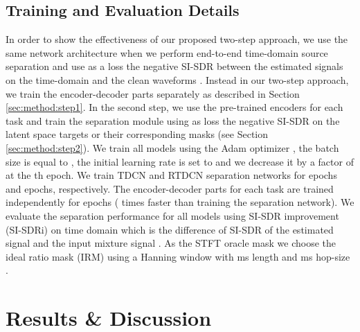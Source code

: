 \documentclass{article}
\begin{document}
\subsection{Training and Evaluation Details}
In order to show the effectiveness of our proposed two-step approach, we use the same network architecture when we perform end-to-end time-domain source separation and use as a loss the negative SI-SDR between the estimated signals on the time-domain and the clean waveforms . Instead in our two-step approach, we train the encoder-decoder parts separately as described in Section \ref{sec:method:step1}. In the second step, we use the pre-trained encoders for each task and train the separation module using as loss the negative SI-SDR on the latent space targets  or their corresponding masks  (see Section \ref{sec:method:step2}). We train all models using the Adam optimizer \cite{adam}, the batch size is equal to , the initial learning rate is set to  and we decrease it by a factor of  at the th epoch. We train TDCN and RTDCN separation networks for  epochs and  epochs, respectively. The encoder-decoder parts for each task are trained independently for  epochs ( times faster than training the separation network). We evaluate the separation performance for all models using SI-SDR improvement (SI-SDRi) on time domain which is the difference of SI-SDR of the estimated signal and the input mixture signal \cite{luo2019convTasNet, kavalerov2019universal}. As the STFT oracle mask we choose the ideal ratio mask (IRM) using a Hanning window with ms length and ms hop-size \cite{luo2019convTasNet}.  
\section{Results \& Discussion}
\end{document}
